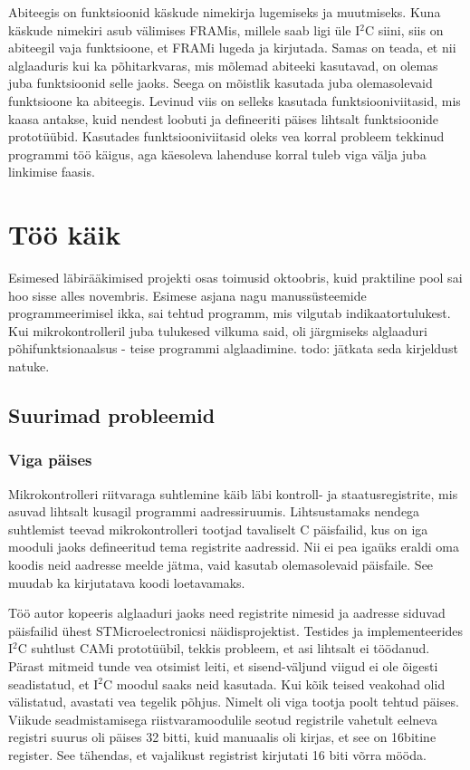 \documentclass[12pt,a4paper]{article}
\newcommand{\iic}{I\({}^2\)C }
\begin{document}
Abiteegis on funktsioonid käskude nimekirja lugemiseks ja muutmiseks. Kuna
käskude nimekiri asub välimises FRAMis, millele saab ligi üle \iic siini, siis
on abiteegil vaja funktsioone, et FRAMi lugeda ja kirjutada. Samas on teada, et
nii alglaaduris kui ka põhitarkvaras, mis mõlemad abiteeki kasutavad, on olemas
juba funktsioonid selle jaoks. Seega on mõistlik kasutada juba olemasolevaid
funktsioone ka abiteegis. Levinud viis on selleks kasutada funktsiooniviitasid,
mis kaasa antakse, kuid nendest loobuti ja defineeriti päises lihtsalt
funktsioonide prototüübid. Kasutades funktsiooniviitasid oleks vea korral
probleem tekkinud programmi töö käigus, aga käesoleva lahenduse korral tuleb
viga välja juba linkimise faasis.

\section{Töö käik}
Esimesed läbirääkimised projekti osas toimusid oktoobris, kuid praktiline pool
sai hoo sisse alles novembris. Esimese asjana nagu manussüsteemide
programmeerimisel ikka, sai tehtud programm, mis vilgutab indikaatortulukest.
Kui mikrokontrolleril juba tulukesed vilkuma said, oli järgmiseks alglaaduri
põhifunktsionaalsus - teise programmi alglaadimine. todo: jätkata seda kirjeldust
natuke.

\subsection{Suurimad probleemid}
\subsubsection{Viga päises}
Mikrokontrolleri riitvaraga suhtlemine käib läbi kontroll- ja staatusregistrite,
mis asuvad lihtsalt kusagil programmi aadressiruumis. Lihtsustamaks nendega
suhtlemist teevad mikrokontrolleri tootjad tavaliselt C päisfailid, kus on iga
mooduli jaoks defineeritud tema registrite aadressid. Nii ei pea igaüks eraldi
oma koodis neid aadresse meelde jätma, vaid kasutab olemasolevaid päisfaile. See
muudab ka kirjutatava koodi loetavamaks.

Töö autor kopeeris alglaaduri jaoks need registrite nimesid ja aadresse siduvad
päisfailid ühest STMicroelectronicsi näidisprojektist. Testides ja
implementeerides \iic suhtlust CAMi prototüübil, tekkis probleem, et asi
lihtsalt ei töödanud. Pärast mitmeid tunde vea otsimist leiti, et
sisend-väljund viigud ei ole õigesti seadistatud, et \iic moodul saaks neid
kasutada. Kui kõik teised veakohad olid välistatud, avastati vea tegelik põhjus.
Nimelt oli viga tootja poolt tehtud päises. Viikude seadmistamisega
riistvaramoodulile seotud registrile vahetult eelneva registri suurus oli päises
32 bitti, kuid manuaalis oli kirjas, et see on 16bitine register. See tähendas,
et vajalikust registrist kirjutati 16 biti võrra mööda. 
\end{document}
